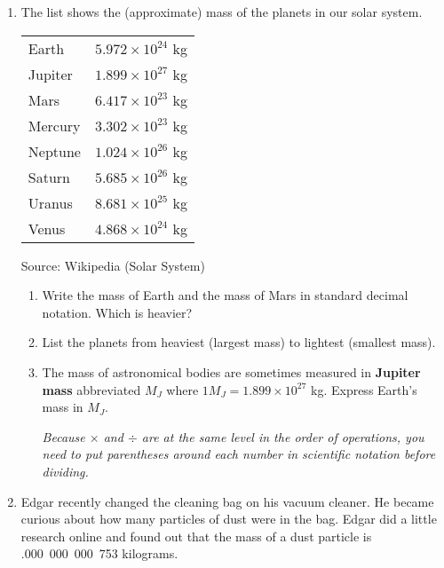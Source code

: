\begin{enumerate}
\item The list shows the (approximate) mass of the planets in our solar system.
\begin{center}
\begin{tabular} {ll}
Earth & $5.972 \times 10^{24}$ kg \\
Jupiter &  $1.899 \times 10^{27}$ kg  \\
Mars & $6.417 \times 10^{23}$ kg \\ 
Mercury & $3.302 \times 10^{23}$ kg \\
Neptune & $1.024 \times 10^{26}$ kg \\
Saturn & $5.685 \times 10^{26}$ kg \\
Uranus & $8.681 \times 10^{25}$ kg \\
Venus & $4.868 \times 10^{24}$ kg \\ 
\end{tabular}
\end{center}
\hfill \begin{footnotesize} Source:  Wikipedia (Solar System) \end{footnotesize}
\begin{enumerate}
\item Write the mass of Earth and the mass of Mars in standard decimal notation.  Which is heavier?\vfill
\item List the planets from heaviest (largest mass) to lightest (smallest mass).\vfill 
\item The mass of astronomical bodies are sometimes measured in \textbf{Jupiter mass} abbreviated $M_J$ where $1 M_J = 1.899 \times 10^{27}$ kg.  Express Earth's mass in $M_J$.

 \emph{Because $\times$ and $\div$ are at the same level in the order of operations, you need to put parentheses around each number in scientific notation before dividing.} \vfill
\end{enumerate}


\newpage %

\item Edgar recently changed the cleaning bag on his vacuum cleaner.  He became curious about how many particles of dust were in the bag.  Edgar did a little research online and found out that the mass of a dust particle is .000~000~000~753 kilograms.  


\end{enumerate}
